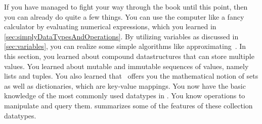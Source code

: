 %
%
\begin{table}%
%
\caption{Some properties of the four basic collection datatypes of \python, namely~, , , and~.}%
\label{tbl:collectionProperties}%
%
\centering%
%
%
\end{table}%
%
If you have managed to fight your way through the book until this point, then you can already do quite a few things.
You can use the computer like a fancy calculator by evaluating numerical expressions, which you learned in
\cref{sec:simplyDataTypesAndOperations}.
By utilizing variables as discussed in \cref{sec:variables}, you can realize some simple algorithms like approximating~\numberPi.
In this section, you learned about compound datastructures that can store multiple values.
You learned about mutable and immutable sequences of values, namely lists and tuples.
You also learned that \python\ offers you the mathematical notion of sets as well as dictionaries, which are key-value mappings.
You now have the basic knowledge of the most commonly used datatypes in \python.
You know operations to manipulate and query them.
 summarizes some of the features of these collection datatypes.

